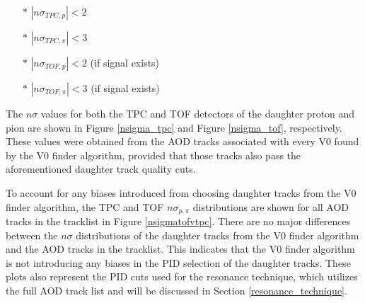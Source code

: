 \documentclass[ALICE,manyauthors]{ALICE_analysis_notes}
\begin{document}
\begin{itemize}
	\item[$\ast$] $|n\sigma_{TPC, p}| < 2$
	\item[$\ast$] $|n\sigma_{TPC, \pi}| < 3$
	\item[$\ast$] $|n\sigma_{TOF, p}| < 2$ (if signal exists)
	\item[$\ast$] $|n\sigma_{TOF, \pi}| < 3$ (if signal exists)
\end{itemize}

The $n\sigma$ values for both the TPC and TOF detectors of the daughter proton and pion are shown in Figure \ref{nsigma_tpc} and Figure \ref{nsigma_tof}, respectively. These values were obtained from the AOD tracks associated with every V0 found by the V0 finder algorithm, provided that those tracks also pass the aforementioned daughter track quality cuts.

To account for any biases introduced from choosing daughter tracks from the V0 finder algorithm, the TPC and TOF $n\sigma_{p, \pi}$ distributions are shown for all AOD tracks in the tracklist in Figure \ref{nsigmatofvtpc}. There are no major differences between the $n\sigma$ distributions of the daughter tracks from the V0 finder algorithm and the AOD tracks in the tracklist. This indicates that the V0 finder algorithm is not introducing any biases in the PID selection of the daughter tracks. These plots also represent the PID cuts used for the resonance technique, which utilizes the full AOD track list and will be discussed in Section \ref{resonance_technique}.
\end{document}
